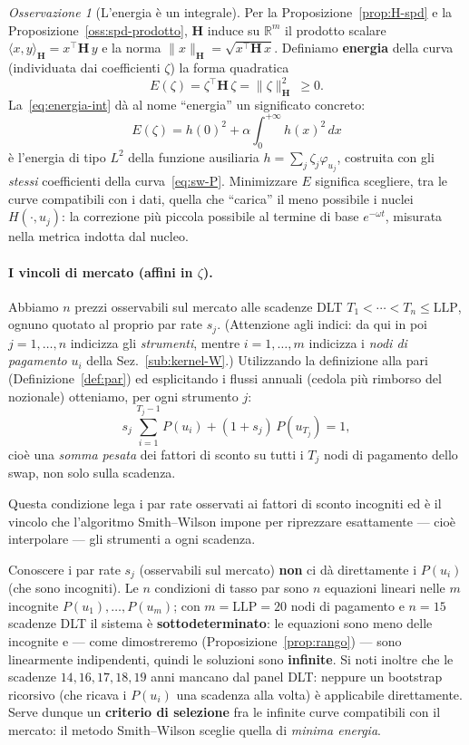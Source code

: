 \documentclass[11pt,a4paper]{article}
\theoremstyle{plain}
\theoremstyle{definition}
\theoremstyle{remark}
\newtheorem*{osservazione}{Osservazione}
\newcommand{\LLP}{\ensuremath{\mathrm{LLP}}}
\newcommand{\Hmat}{\mathbf{H}}
\newcommand{\transp}{^{\!\top}}
\begin{document}
\begin{osservazione}[L'energia \`e un integrale]
\label{oss:energia}
Per la Proposizione~\ref{prop:H-spd} e la Proposizione~\ref{oss:spd-prodotto}, $\Hmat$
induce su $\mathbb{R}^m$ il prodotto scalare
$\langle x,y\rangle_{\Hmat} = x\transp\Hmat\,y$ e la norma
$\|x\|_{\Hmat} = \sqrt{x\transp\Hmat\,x}$.
Definiamo \textbf{energia} della curva (individuata dai coefficienti $\zeta$) la forma quadratica
\[
  E(\zeta) = \zeta\transp \Hmat\, \zeta = \|\zeta\|_{\Hmat}^2 \ \ge 0 .
\]
La~\eqref{eq:energia-int} d\`a al nome ``energia'' un significato concreto:
\[
  E(\zeta) = h(0)^2 + \alpha\!\int_0^{+\infty}\! h(x)^2\,dx
\]
\`e l'energia di tipo $L^2$ della funzione ausiliaria $h=\sum_j\zeta_j\varphi_{u_j}$,
costruita con gli \emph{stessi} coefficienti della curva~\eqref{eq:sw-P}. Minimizzare $E$
significa scegliere, tra le curve compatibili con i dati, quella che ``carica'' il meno
possibile i nuclei $H(\cdot,u_j)$: la correzione pi\`u piccola possibile al termine di base
$e^{-\omega t}$, misurata nella metrica indotta dal nucleo.
\end{osservazione}

\paragraph{I vincoli di mercato (affini in $\zeta$).}
Abbiamo $n$ prezzi osservabili sul mercato alle scadenze DLT $T_1<\cdots<T_n\le\LLP$, ognuno
quotato al proprio par rate $s_j$. (Attenzione agli indici: da qui in poi $j=1,\dots,n$
indicizza gli \emph{strumenti}, mentre $i=1,\dots,m$ indicizza i \emph{nodi di pagamento}
$u_i$ della Sez.~\ref{sub:kernel-W}.) Utilizzando la definizione alla pari
(Definizione~\ref{def:par}) ed esplicitando i flussi annuali (cedola pi\`u rimborso del
nozionale) otteniamo, per ogni strumento $j$:
\[
  s_j\,\sum_{i=1}^{T_j-1} P(u_i) + (1+s_j)\,P(u_{T_j}) = 1,
\]
cio\`e una \emph{somma pesata} dei fattori di sconto su tutti i $T_j$ nodi di pagamento dello
swap, non solo sulla scadenza.

Questa condizione lega i par rate osservati ai fattori di sconto incogniti ed \`e il vincolo che
l'algoritmo Smith--Wilson impone per riprezzare esattamente --- cio\`e interpolare --- gli
strumenti a ogni scadenza.

Conoscere i par rate $s_j$ (osservabili sul mercato) \textbf{non} ci d\`a direttamente i
$P(u_i)$ (che sono incogniti). Le $n$ condizioni di tasso par sono $n$ equazioni lineari nelle $m$
incognite $P(u_1),\ldots,P(u_m)$; con $m = \LLP = 20$ nodi di pagamento e $n = 15$ scadenze
DLT il sistema \`e \textbf{sottodeterminato}: le equazioni sono meno delle incognite e ---
come dimostreremo (Proposizione~\ref{prop:rango}) --- sono linearmente indipendenti, quindi
le soluzioni sono \textbf{infinite}. Si noti inoltre che le scadenze $14, 16, 17, 18, 19$
anni mancano dal panel DLT: neppure un bootstrap ricorsivo (che ricava i $P(u_i)$ una
scadenza alla volta) \`e applicabile direttamente. Serve dunque un \textbf{criterio di
selezione} fra le infinite curve compatibili con il mercato: il metodo Smith--Wilson
sceglie quella di \emph{minima energia}.
\end{document}
